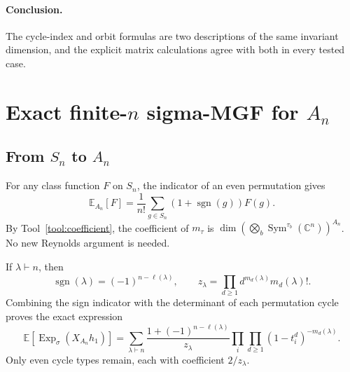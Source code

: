 \documentclass[10pt]{article}
\newcommand{\Sym}{\operatorname{Sym}}
\newcommand{\ExpS}{\operatorname{Exp}_{\sigma}}
\newcommand{\smg}[1]{\mathbb E\!\left[\ExpS\!\left(X_{#1}h_1\right)\right]}
\begin{document}
\paragraph{Conclusion.}
The cycle-index and orbit formulas are two descriptions of the same invariant
dimension, and the explicit matrix calculations agree with both in every
tested case.
\endgroup


\clearpage
\section[Exact finite-n sigma-MGF for A-n]{Exact finite-$n$ sigma-MGF for $A_n$}\label{proof:alternating-exact}
\begingroup
{}
\providecommand{\Sym}{\operatorname{Sym}}
\renewcommand{\Sym}{\operatorname{Sym}}
\setcounter{theorem}{0}
\setcounter{proposition}{0}
\setcounter{lemma}{0}
\setcounter{corollary}{0}
\setcounter{remark}{0}
\begin{abstract}
The asymptotic agreement with $S_n$ is imported from Theorem B; for $n\ge2$, this section proves the exact cycle-type formula for the permutation
representation of $A_n$, derives the correction to the $S_n$ vector-partition
count from orbit splitting, and proves equality with $S_n$ in degree at most
$n-2$.  Explicit even permutation matrices and Reynolds projectors verify the
formula, including a boundary case with a nonzero splitting correction.
\end{abstract}

\subsection{From \texorpdfstring{$S_n$}{S-n} to \texorpdfstring{$A_n$}{A-n}}
For any class function $F$ on $S_n$, the indicator of an even permutation gives
\[
 \mathbb E_{A_n}[F]=\frac1{n!}\sum_{g\in S_n}(1+\operatorname{sgn}(g))F(g).
\]
By Tool~\ref{tool:coefficient}, the coefficient of $m_\tau$ is
$\dim(\bigotimes_b\Sym^{\tau_b}(\mathbb C^n))^{A_n}$.  No new
Reynolds argument is needed.

If $\lambda\vdash n$, then
\[
 \operatorname{sgn}(\lambda)=(-1)^{n-\ell(\lambda)},\qquad
 z_\lambda=\prod_{d\ge1}d^{m_d(\lambda)}m_d(\lambda)!.
\]
Combining the sign indicator with the determinant of each permutation cycle
proves the exact expression
\[
 \boxed{\smg{A_n}=\sum_{\lambda\vdash n}
 \frac{1+(-1)^{n-\ell(\lambda)}}{z_\lambda}
 \prod_i\prod_{d\ge1}(1-t_i^d)^{-m_d(\lambda)}.}
\]
Only even cycle types remain, each with coefficient $2/z_\lambda$.
\end{document}
